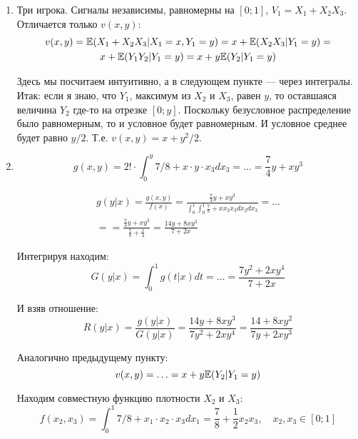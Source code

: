 \begin{enumerate}
\begin{enumerate}
\item Три игрока. Сигналы независимы, равномерны на $ [0;1] $, $ V_{1}=X_{1}+X_{2}X_{3} $.
Отличается только $ v(x,y) $:
\begin{multline}
v(x,y)=\mathbb{E}(X_{1}+X_{2}X_{3}|X_{1}=x,Y_{1}=y)=x+\mathbb{E}(X_{2}X_{3}|Y_{1}=y)=\\
x+\mathbb{E}(Y_{1}Y_{2}|Y_{1}=y)=x+y\mathbb{E}(Y_{2}|Y_{1}=y)
\end{multline}

Здесь мы посчитаем интуитивно, а в следующем пункте --- через интегралы. Итак: если я знаю, что $ Y_{1} $, максимум из $ X_{2} $ и $ X_{3} $, равен $ y $, то оставшаяся величина $ Y_{2} $ где-то на отрезке $[0;y] $. Поскольку безусловное распределение было равномерным, то и условное будет равномерным. И условное среднее будет равно $ y/2 $. Т.е. $ v(x,y)=x+y^{2}/2 $.


\item 

\begin{equation}
g(x,y)=2!\cdot \int_{0}^{y} 7/8+x\cdot y\cdot x_{3} dx_{3}=\ldots=\frac{7}{4}y+xy^{3}
\end{equation}

\begin{multline}
g(y|x)=\frac{g(x,y)}{f(x)}=\frac{\frac{7}{4}y+xy^{3}}{\int_{0}^{1}\int_{0}^{1} \frac{7}{8}+xx_{2}x_{3}dx_{2}dx_{3}}=\ldots\\
==\frac{\frac{7}{4}y+xy^{3}}{\frac{7}{8}+\frac{x}{4}}=\frac{14y+8xy^{3}}{7+2x}
\end{multline}

Интегрируя находим:
\begin{equation}
G(y|x)=\int_{0}^{1} g(t|x) dt=\ldots=\frac{7y^{2}+2xy^{4}}{7+2x}
\end{equation}

И взяв отношение:
\begin{equation}
R(y|x)=\frac{g(y|x)}{G(y|x)}=\frac{14y+8xy^{3}}{7y^{2}+2xy^{4}}=\frac{14+8xy^{2}}{7y+2xy^{3}}
\end{equation}

Аналогично предыдущему пункту:
\begin{equation}
v(x,y)=\ldots=x+y\mathbb{E}(Y_{2}|Y_{1}=y)
\end{equation}



Находим совместную функцию плотности $ X_{2} $ и $ X_{3} $:
\begin{equation}
f(x_{2},x_{3})=\int_{0}^{1} 7/8+x_{1}\cdot x_{2}\cdot x_{3} dx_{1}=\frac{7}{8}+\frac{1}{2}x_{2}x_{3}, \quad x_{2},x_{3}\in [0;1]
\end{equation}


\end{enumerate}
\end{enumerate}
